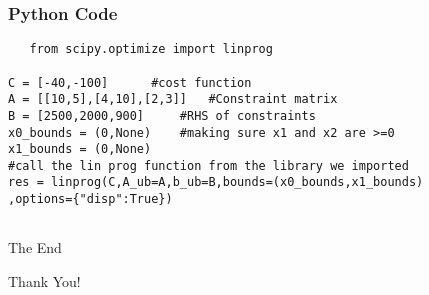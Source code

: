 \documentclass{beamer}
\begin{document}
\begin{frame}[fragile] %
\frametitle{Python Code}
\begin{example}
\begin{verbatim}
   from scipy.optimize import linprog

C = [-40,-100]      #cost function
A = [[10,5],[4,10],[2,3]]   #Constraint matrix
B = [2500,2000,900]     #RHS of constraints
x0_bounds = (0,None)    #making sure x1 and x2 are >=0
x1_bounds = (0,None)
#call the lin prog function from the library we imported
res = linprog(C,A_ub=A,b_ub=B,bounds=(x0_bounds,x1_bounds)
,options={"disp":True})
   
\end{verbatim}
\end{example}
\end{frame}



\begin{frame}
\Huge{\centerline{The End}}
\quad \quad\quad \quad \quad Thank You!
\end{frame}





\end{document}
